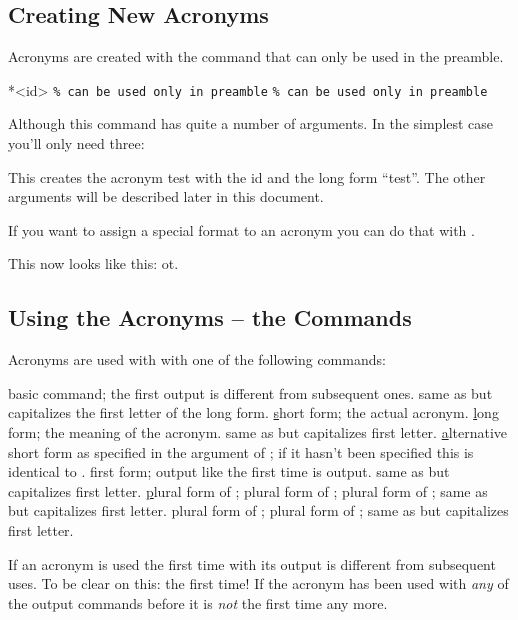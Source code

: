 \documentclass[DIV10,toc=index,toc=bib]{cnpkgdoc}
\let\h\uline
\begin{document}
\subsection{Creating New Acronyms}
Acronyms are created with the command  that can only be used in
the preamble.
\begin{beschreibung}
 *{<id>}
 \verb+% can be used only in preamble+
  \verb+% can be used only in preamble+
\end{beschreibung}
Although this command has quite a number of arguments. In the simplest case you'll
only need three:
\begin{beispiel}
\end{beispiel}
This creates the acronym \acs{test} with the \acs{id}  and the long form
``\acl{test}''. The other arguments will be described later in this document.

If you want to assign a special format to an acronym you can do that with
.
\begin{beispiel}
\end{beispiel}
This now looks like this: \acs{ot}.

\subsection{Using the Acronyms -- the Commands}
Acronyms are used with with one of the following commands:
\begin{beschreibung}
  basic command; the first output is different from subsequent ones.
  same as  but capitalizes the first letter of the long form.
  \h{s}hort form; the actual acronym.
  \h{l}ong form; the meaning of the acronym.
  same as  but capitalizes first letter.
  \h{a}lternative short form as specified in the  argument
 of ; if it hasn't been specified this is identical to .
  first form; output like the first time  is output.
  same as  but capitalizes first letter.
  \h{p}lural form of ;
  plural form of ;
  plural form of ;
  same as  but capitalizes first letter.
  plural form of ;
  plural form of ;
  same as  but capitalizes first letter.
\end{beschreibung}
If an acronym is used the first time with  its output is different from
subsequent uses. To be clear on this: the first time! If the acronym has been
used with \emph{any} of the output commands before it is \emph{not} the first
time any more.
\end{document}
